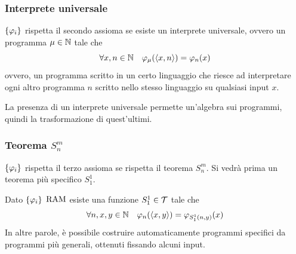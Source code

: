 \subsubsection{Interprete universale}
$\{\varphi_i\}$ rispetta il secondo assioma se esiste un interprete universale, ovvero un programma $\mu \in \mathbb{N}$ tale che
$$ \forall x,n \in \mathbb{N} \quad \varphi_\mu (\langle x,n \rangle) = \varphi_n (x) $$
ovvero, un programma scritto in un certo linguaggio che riesce ad interpretare ogni altro programma $n$ scritto nello stesso linguaggio su qualsiasi input $x$.

La presenza di un interprete universale permette un'algebra sui programmi, quindi la trasformazione di quest'ultimi.

\subsubsection{Teorema $S_n^m$}
$\{\varphi_i\}$ rispetta il terzo assioma se rispetta il teorema $S_n^m$. Si vedrà prima un teorema più specifico $S_1^1$. \\

\begin{theor}[$S_1^1$]
	Dato $\{\varphi_i\}$ $\text{RAM}$ esiste una funzione $S_1^1 \in \mathcal{T}$ tale che
	$$ \forall n,x,y \in \mathbb{N} \quad \varphi_n(\langle x,y \rangle) = \varphi_{S_1^1 (n,y)} (x) $$
In altre parole, è possibile costruire automaticamente programmi specifici da programmi più generali, ottenuti fissando alcuni input.
\end{theor}

